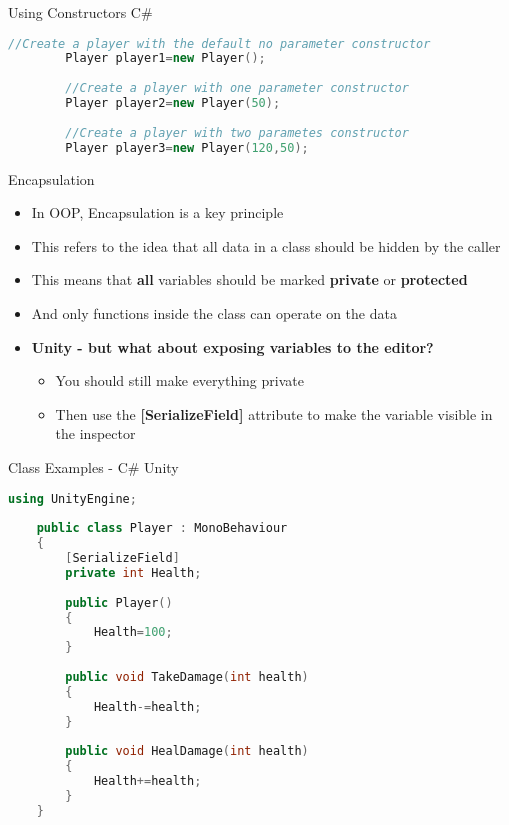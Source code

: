 \begin{frame}[fragile]{Using Constructors C\#}
	\begin{lstlisting}[language=C++,basicstyle=\tiny,]
		//Create a player with the default no parameter constructor
		Player player1=new Player();
		
		//Create a player with one parameter constructor
		Player player2=new Player(50);
		
		//Create a player with two parametes constructor
		Player player3=new Player(120,50);
	\end{lstlisting}
\end{frame}

\begin{frame}{Encapsulation}
	\begin{itemize}
		\pause \item In OOP, Encapsulation is a key principle 
		\pause \item This refers to the idea that all data in a class should be hidden by the caller
		\pause \item This means that \textbf{all} variables should be marked \textbf{private} or \textbf{protected}
		\pause \item And only functions inside the class can operate on the data
		\pause \item \textbf{Unity - but what about exposing variables to the editor?}
		\begin{itemize}
			\pause \item You should still make everything private
			\pause \item Then use the \textbf{[SerializeField]} attribute to make the variable visible in the inspector
		\end{itemize}
	\end{itemize}
\end{frame}


\begin{frame}[fragile]{Class Examples - C\# Unity}
	\begin{lstlisting}[language=C++,basicstyle=\tiny,]
	using UnityEngine;
	
	public class Player : MonoBehaviour
	{
		[SerializeField]
		private int Health;
	
		public Player()
		{
			Health=100;
		}
	
		public void TakeDamage(int health)
		{
			Health-=health;
		}
	
		public void HealDamage(int health)
		{
			Health+=health;
		}
	}
	\end{lstlisting}
\end{frame}

